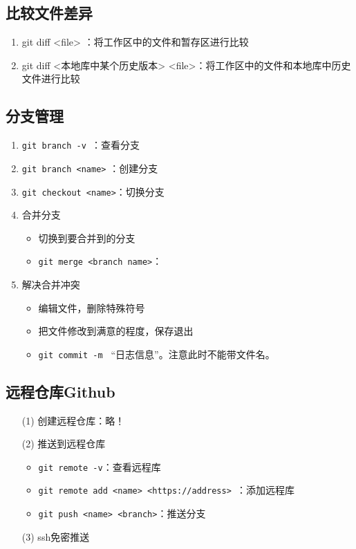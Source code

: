 \documentclass[a4paper,11pt,twoside]{book}
\begin{document}
\subsection{比较文件差异}
\begin{enumerate}
\item git diff <file> ：将工作区中的文件和暂存区进行比较
\item git diff <本地库中某个历史版本> <file>：将工作区中的文件和本地库中历史文件进行比较
\end{enumerate}



\subsection{分支管理}
\begin{enumerate}
\item \verb|git branch -v |：查看分支
\item \verb|git branch <name>| ：创建分支
\item \verb|git checkout <name>|：切换分支
\item 合并分支
\begin{itemize}
\item 切换到要合并到的分支
\item \verb|git merge <branch name>|：
\end{itemize}
\item 解决合并冲突
\begin{itemize}
\item  编辑文件，删除特殊符号
\item 把文件修改到满意的程度，保存退出
\item \verb|git commit -m | ``日志信息''。注意此时不能带文件名。
\end{itemize}
\end{enumerate}



\subsection{远程仓库Github}
\begin{itemize}
\item[(1)] 创建远程仓库：略！

\item[(2)] 推送到远程仓库
\begin{itemize}
\item \verb|git remote -v|：查看远程库
\item \verb|git remote add <name> <https://address> |：添加远程库
\item \verb|git push <name> <branch>|：推送分支
\end{itemize}

\item [(3)] ssh免密推送
\end{itemize}
\end{document}
